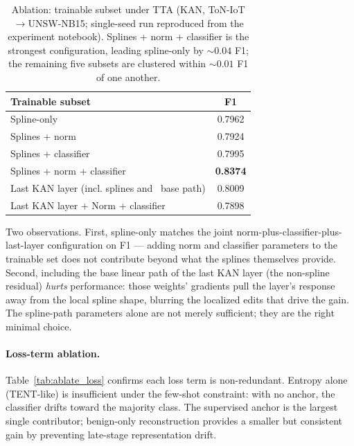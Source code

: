 \documentclass[10pt, conference, letterpaper]{IEEEtran}
\begin{document}
\begin{table}[h]
\centering
\caption{Ablation: trainable subset under TTA (KAN, ToN-IoT$\to$UNSW-NB15; single-seed run reproduced from the experiment notebook). Splines + norm + classifier is the strongest configuration, leading spline-only by ${\sim}0.04$ F1; the remaining five subsets are clustered within ${\sim}0.01$ F1 of one another.}
\label{tab:ablate_layers}
\begin{tabular}{lc}
\toprule
\textbf{Trainable subset} & \textbf{F1} \\
\midrule
Spline-only                          & 0.7962 \\
Splines + norm                       & 0.7924 \\
Splines + classifier                 & 0.7995 \\
Splines + norm + classifier          & \textbf{0.8374} \\
Last KAN layer (incl. splines and \ base path)    & 0.8009 \\
Last KAN layer + Norm + classifier      & 0.7898 \\
\bottomrule
\end{tabular}
\end{table}



Two observations. First, spline-only matches the joint norm-plus-classifier-plus-last-layer configuration on F1 --- adding norm and classifier parameters to the trainable set does not contribute beyond what the splines themselves provide. Second, including the base linear path of the last KAN layer (the non-spline residual) \emph{hurts} performance: those weights' gradients pull the layer's response away from the local spline shape, blurring the localized edits that drive the gain. The spline-path parameters alone are not merely sufficient; they are the right minimal choice.

\paragraph{Loss-term ablation.} Table~\ref{tab:ablate_loss} confirms each loss term is non-redundant. Entropy alone (TENT-like) is insufficient under the few-shot constraint: with no anchor, the classifier drifts toward the majority class. The supervised anchor is the largest single contributor; benign-only reconstruction provides a smaller but consistent gain by preventing late-stage representation drift.
\end{document}
